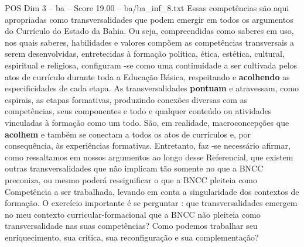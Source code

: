 \begin{textsample}{POS Dim 3 – ba – Score 19.00 – ba/ba\_inf\_8.txt}
Essas competências são aqui apropriadas como transversalidades que podem emergir em todos os argumentos do Currículo do Estado da Bahia.
Ou seja, compreendidas como saberes em uso, nos quais saberes, habilidades e valores compõem as competências transversais a serem desenvolvidas, entretecidas à formação política, ética, estética, cultural, espiritual e religiosa, configuram -se como uma continuidade a ser cultivada pelos atos de currículo durante toda a Educação Básica, respeitando e \textbf{acolhendo} as especificidades de cada etapa.
As transversalidades \textbf{pontuam} e atravessam, como espirais, as etapas formativas, produzindo conexões diversas com as competências, seus componentes e todo e qualquer conteúdo ou atividades vinculadas à formação como um todo.
São, em realidade, macroconcepções que \textbf{acolhem} e também se conectam a todos os atos de currículos e, por consequência, às experiências formativas.
Entretanto, faz -se necessário afirmar, como ressaltamos em nossos argumentos ao longo desse Referencial, que existem outras transversalidades que não implicam tão somente no que a BNCC preconiza, ou mesmo poderá ressignificar o que a BNCC pleiteia como Competência a ser trabalhada, levando em conta a singularidade dos contextos de formação.
O exercício importante é se perguntar : que transversalidades emergem no meu contexto curricular-formacional que a BNCC não pleiteia como transversalidade nas suas competências?
Como podemos trabalhar seu enriquecimento, sua crítica, sua reconfiguração e sua complementação?

\end{textsample}

